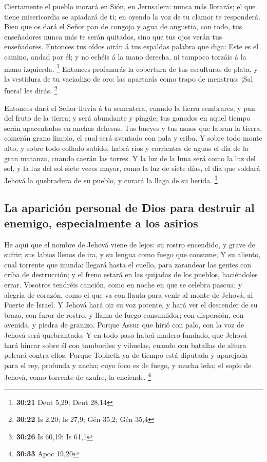  Ciertamente el pueblo morará en Sión, en Jerusalem: nunca
más llorarás; el que tiene misericordia se apiadará de ti; en oyendo la
voz de tu clamor te responderá.  Bien que os dará el Señor
pan de congoja y agua de angustia, con todo, tus enseñadores nunca más
te serán quitados, sino que tus ojos verán tus enseñadores.
 Entonces tus oídos oirán á tus espaldas palabra que diga:
Este es el camino, andad por él; y no echéis á la mano derecha, ni
tampoco torzáis á la mano izquierda. \footnote{\textbf{30:21} Deut 5,29;
  Deut 28,14}  Entonces profanarás la cobertura de tus
esculturas de plata, y la vestidura de tu vaciadizo de oro: las
apartarás como trapo de menstruo: ¡Sal fuera! les dirás. \footnote{\textbf{30:22}
  Is 2,20; Is 27,9; Gén 35,2; Gén 35,4}

 Entonces dará el Señor lluvia á tu sementera, cuando la
tierra sembrares; y pan del fruto de la tierra; y será abundante y
pingüe; tus ganados en aquel tiempo serán apacentados en anchas dehesas.
 Tus bueyes y tus asnos que labran la tierra, comerán grano
limpio, el cual será aventado con pala y criba.  Y sobre
todo monte alto, y sobre todo collado subido, habrá ríos y corrientes de
aguas el día de la gran matanza, cuando caerán las torres. 
Y la luz de la luna será como la luz del sol, y la luz del sol siete
veces mayor, como la luz de siete días, el día que soldará Jehová la
quebradura de su pueblo, y curará la llaga de su herida. \footnote{\textbf{30:26}
  Is 60,19; Is 61,1}

\hypertarget{la-apariciuxf3n-personal-de-dios-para-destruir-al-enemigo-especialmente-a-los-asirios}{%
\subsection{La aparición personal de Dios para destruir al enemigo,
especialmente a los
asirios}\label{la-apariciuxf3n-personal-de-dios-para-destruir-al-enemigo-especialmente-a-los-asirios}}

 He aquí que el nombre de Jehová viene de lejos: su rostro
encendido, y grave de sufrir; sus labios llenos de ira, y su lengua como
fuego que consume;  Y su aliento, cual torrente que inunda:
llegará hasta el cuello, para zarandear las gentes con criba de
destrucción; y el freno estará en las quijadas de los pueblos,
haciéndoles errar.  Vosotros tendréis canción, como en
noche en que se celebra pascua; y alegría de corazón, como el que va con
flauta para venir al monte de Jehová, al Fuerte de Israel. 
Y Jehová hará oir su voz potente, y hará ver el descender de su brazo,
con furor de rostro, y llama de fuego consumidor; con dispersión, con
avenida, y piedra de granizo.  Porque Assur que hirió con
palo, con la voz de Jehová será quebrantado.  Y en todo
paso habrá madero fundado, que Jehová hará hincar sobre él con
tamboriles y vihuelas, cuando con batallas de altura peleará contra
ellos.  Porque Topheth ya de tiempo está diputada y
aparejada para el rey, profunda y ancha; cuyo foco es de fuego, y mucha
leña; el soplo de Jehová, como torrente de azufre, la enciende.
\footnote{\textbf{30:33} Apoc 19,20}

